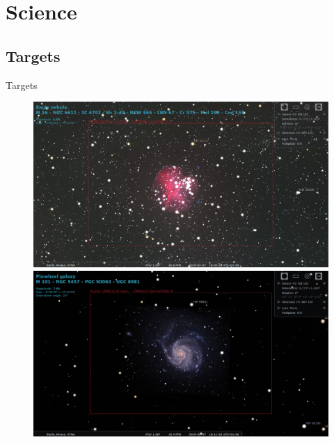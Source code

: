 \documentclass[11pt, aspectratio=169]{beamer}
\begin{document}
\section{Science}
\subsection{Targets}
\begin{frame}{Targets}
\vspace{-0.25cm}
\begin{figure}[!htb]
    \begin{minipage}[t]{.42\textwidth}
        \centering
        \includegraphics[width=\linewidth]{figures/targets/Eagle.png}
    \end{minipage}%
	\begin{minipage}[t]{.42\textwidth}
        \centering
        \includegraphics[width=\linewidth]{figures/targets/Pinwheel.png}
    \end{minipage}%
    
    

\end{figure}
\end{frame}
\end{document}
